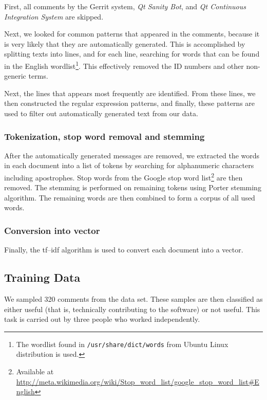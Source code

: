 \documentclass[conference]{IEEEtran}
\begin{document}
First, all comments by the Gerrit system, \emph{Qt Sanity Bot}, and \emph{Qt Continuous Integration System} are skipped.

Next, we looked for common patterns that appeared in the comments, because it is very likely that they are automatically generated.
This is accomplished by splitting texts into lines, and for each line, searching for words that can be found in the English wordlist\footnote{The wordlist found in \texttt{/usr/share/dict/words} from Ubuntu Linux distribution is used.}.
This effectively removed the ID numbers and other non-generic terms.

Next, the lines that appears most frequently are identified.
From these lines, we then constructed the regular expression patterns,
and finally, these patterns are used to filter out automatically generated text from our data.

\subsubsection{Tokenization, stop word removal and stemming}

After the automatically generated messages are removed, we extracted the words in each document into a list of tokens by searching for alphanumeric characters including apostrophes.
Stop words from the Google stop word list\footnote{Available at \url{http://meta.wikimedia.org/wiki/Stop_word_list/google_stop_word_list#English}} are then removed.
The stemming is performed on remaining tokens using Porter stemming algorithm.
The remaining words are then combined to form a corpus of all used words.

\subsubsection{Conversion into vector}

Finally, the tf--idf algorithm is used to convert each document into a vector.


\subsection{Training Data}

We sampled 320 comments from the data set.
These samples are then classified as either useful (that is, technically contributing to the software) or not useful.
This task is carried out by three people who worked independently.
\end{document}

